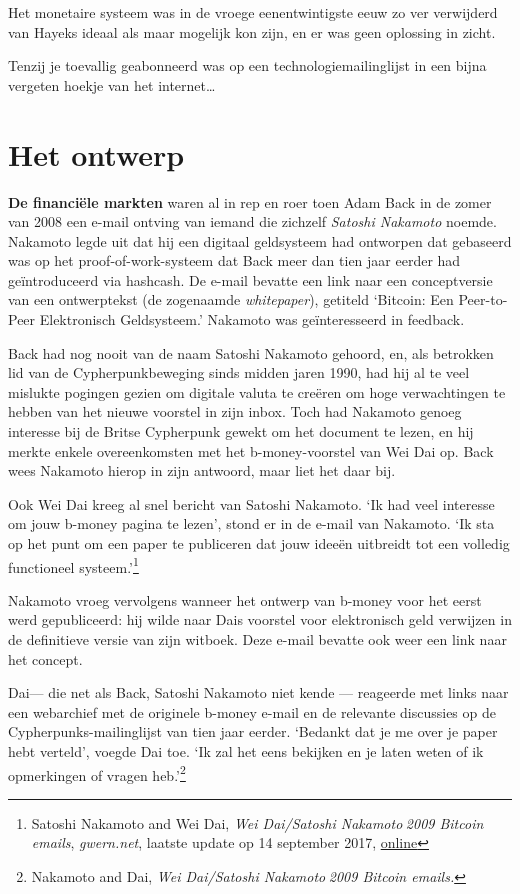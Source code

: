 \documentclass[
  a5paper,
  smalldemyvopaper,11pt,twoside,onecolumn,openright,extrafontsizes,
hidelinks]{memoir}
\begin{document}
Het monetaire systeem was in de vroege eenentwintigste eeuw zo ver
verwijderd van Hayeks ideaal als maar mogelijk kon zijn, en er was geen
oplossing in zicht.

Tenzij je toevallig geabonneerd was op een technologiemailinglijst in
een bijna vergeten hoekje van het internet\ldots{}

\chapter{Het ontwerp}\label{het-ontwerp}

\textbf{De financiële markten} waren al in rep en roer toen Adam Back in
de zomer van 2008 een e-mail ontving van iemand die zichzelf
\emph{Satoshi Nakamoto} noemde. Nakamoto legde uit dat hij een digitaal
geldsysteem had ontworpen dat gebaseerd was op het proof-of-work-systeem
dat Back meer dan tien jaar eerder had geïntroduceerd via hashcash. De
e-mail bevatte een link naar een conceptversie van een ontwerptekst (de
zogenaamde \emph{whitepaper}), getiteld `Bitcoin: Een Peer-to-Peer
Elektronisch Geldsysteem.' Nakamoto was geïnteresseerd in feedback.

Back had nog nooit van de naam Satoshi Nakamoto gehoord, en, als
betrokken lid van de Cypherpunkbeweging sinds midden jaren 1990, had hij
al te veel mislukte pogingen gezien om digitale valuta te creëren om
hoge verwachtingen te hebben van het nieuwe voorstel in zijn inbox. Toch
had Nakamoto genoeg interesse bij de Britse Cypherpunk gewekt om het
document te lezen, en hij merkte enkele overeenkomsten met het
b-money-voorstel van Wei Dai op. Back wees Nakamoto hierop in zijn
antwoord, maar liet het daar bij.

Ook Wei Dai kreeg al snel bericht van Satoshi Nakamoto. `Ik had veel
interesse om jouw b-money pagina te lezen', stond er in de e-mail van
Nakamoto. `Ik sta op het punt om een paper te publiceren dat jouw ideeën
uitbreidt tot een volledig functioneel systeem.'\footnote{Satoshi
  Nakamoto and Wei Dai, \emph{Wei Dai/Satoshi Nakamoto 2009 Bitcoin
  emails}, \emph{gwern.net}, laatste update op 14 september 2017,
  \href{https://gwern.net/doc/bitcoin/2008-nakamoto}{online}}

Nakamoto vroeg vervolgens wanneer het ontwerp van b-money voor het eerst
werd gepubliceerd: hij wilde naar Dais voorstel voor elektronisch geld
verwijzen in de definitieve versie van zijn witboek. Deze e-mail bevatte
ook weer een link naar het concept.

Dai--- die net als Back, Satoshi Nakamoto niet kende --- reageerde met
links naar een webarchief met de originele b-money e-mail en de
relevante discussies op de Cypherpunks-mailinglijst van tien jaar
eerder. `Bedankt dat je me over je paper hebt verteld', voegde Dai toe.
`Ik zal het eens bekijken en je laten weten of ik opmerkingen of vragen
heb.'\footnote{Nakamoto and Dai, \emph{Wei Dai/Satoshi Nakamoto 2009
  Bitcoin emails.}}
\end{document}
